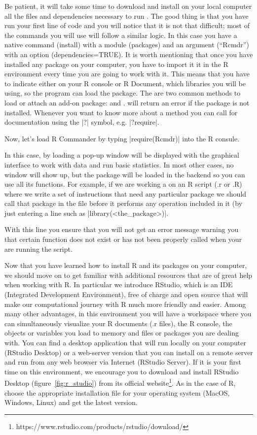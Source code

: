 Be patient, it will take some time to download and install on your
local computer all the files and dependencies necessary to run . The good thing is that you have run your first line of
code and you will notice that it is not that difficult; most of the
commands you will use will follow a similar logic. In this case you
have a native command (install) with a module (packages) and an
argument (``Rcmdr'') with an option (dependencies=TRUE). It is worth
mentioning that once you have installed any package on your computer,
you have to import it it in the R environment every time you are going
to work with it. This means that you have to indicate either on your R
console or R Document, which libraries you will be using, so the
program can load the package. The are two common methods to load or
attach an add-on package:  and . 
will return an error if the package is not installed. Whenever you
want to know more about a method you can call for documentation using
the |?| symbol, e.g. |?require|.

Now, let’s load R Commander by typing |require(Rcmdr)| into the R consule.

In this case, by loading  a pop-up window will be displayed
with the graphical interface to work with data and run basic
statistics. In most other cases, no window will show up, but the
package will be loaded in the backend so you can use all its
functions. For example, if we are working a on an R script (.r or .R)
where we write a set of instructions that need any particular package
we should call that package in the file before it performs any
operation included in it (by just entering a line such as
|library(<the_package>)|.

With this line you ensure that you will not get an error message
warning you that certain function does not exist or has not been
properly called when your are running the script.

Now that you have learned how to install R and its packages on your
computer, we should move on to get familiar with additional resources
that are of great help when working with R. In particular we introduce
RStudio, which is an IDE (Integrated Development Environment),
free of charge and open source that will
make our computational journey with R much more friendly and
easier. Among many other advantages, in this environment you will have
a workspace where you can simultaneously visualize your R documents
(.r files), the R console, the objects or variables you load to memory
and files or packages you are dealing with. You can find a desktop
application that will run locally on your computer (RStudio Desktop)
or a web-server version that you can install on a remote server and
run from any web browser via Internet (RStudio Server). If it is your
first time on this environment, we encourage you to download and
install RStudio Desktop (figure~\ref{fig:r_studio}) from its official
website\footnote{https://www.rstudio.com/products/rstudio/download/}. As
in the case of R, choose the appropriate installation file for
your operating system (MacOS, Windows, Linux) and get the latest
version.

